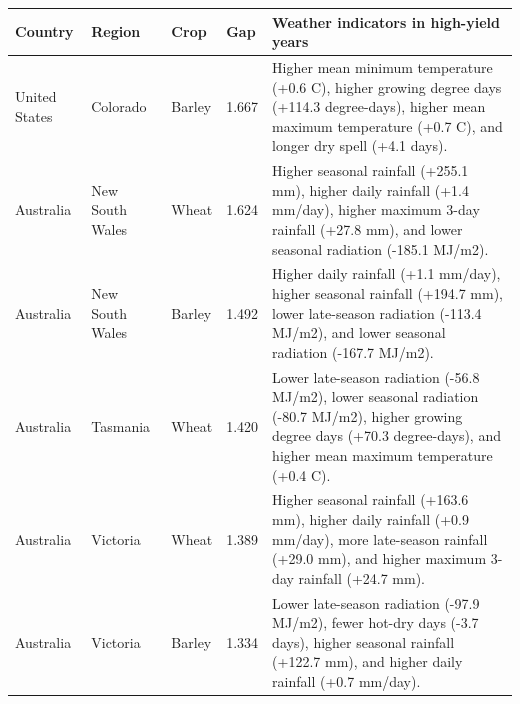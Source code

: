 \begin{tabularx}{\textwidth}{p{}p{}p{}p{}Y}
\toprule
Country & Region & Crop & Gap & Weather indicators in high-yield years \\
\midrule
United States & Colorado & Barley & 1.667 & Higher mean minimum temperature (+0.6 C), higher growing degree days (+114.3 degree-days), higher mean maximum temperature (+0.7 C), and longer dry spell (+4.1 days). \\
Australia & New South Wales & Wheat & 1.624 & Higher seasonal rainfall (+255.1 mm), higher daily rainfall (+1.4 mm/day), higher maximum 3-day rainfall (+27.8 mm), and lower seasonal radiation (-185.1 MJ/m2). \\
Australia & New South Wales & Barley & 1.492 & Higher daily rainfall (+1.1 mm/day), higher seasonal rainfall (+194.7 mm), lower late-season radiation (-113.4 MJ/m2), and lower seasonal radiation (-167.7 MJ/m2). \\
Australia & Tasmania & Wheat & 1.420 & Lower late-season radiation (-56.8 MJ/m2), lower seasonal radiation (-80.7 MJ/m2), higher growing degree days (+70.3 degree-days), and higher mean maximum temperature (+0.4 C). \\
Australia & Victoria & Wheat & 1.389 & Higher seasonal rainfall (+163.6 mm), higher daily rainfall (+0.9 mm/day), more late-season rainfall (+29.0 mm), and higher maximum 3-day rainfall (+24.7 mm). \\
Australia & Victoria & Barley & 1.334 & Lower late-season radiation (-97.9 MJ/m2), fewer hot-dry days (-3.7 days), higher seasonal rainfall (+122.7 mm), and higher daily rainfall (+0.7 mm/day). \\
\bottomrule
\end{tabularx}
